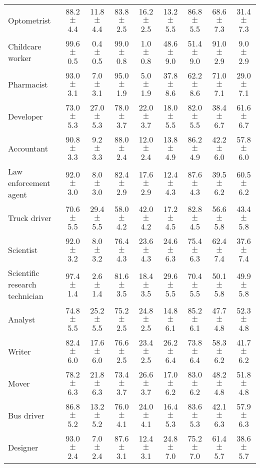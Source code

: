 \begin{table*}[p]
{\begin{tabular}{l|cc|cc|cc|cc}
Optometrist
& 88.2 $\pm$ 4.4 & 11.8 $\pm$ 4.4
& 83.8 $\pm$ 2.5 & 16.2 $\pm$ 2.5
& 13.2 $\pm$ 5.5 & 86.8 $\pm$ 5.5
& 68.6 $\pm$ 7.3 & 31.4 $\pm$ 7.3
\\
Childcare worker
& 99.6 $\pm$ 0.5 & 0.4 $\pm$ 0.5
& 99.0 $\pm$ 0.8 & 1.0 $\pm$ 0.8
& 48.6 $\pm$ 9.0 & 51.4 $\pm$ 9.0
& 91.0 $\pm$ 2.9 & 9.0 $\pm$ 2.9
\\
Pharmacist
& 93.0 $\pm$ 3.1 & 7.0 $\pm$ 3.1
& 95.0 $\pm$ 1.9 & 5.0 $\pm$ 1.9
& 37.8 $\pm$ 8.6 & 62.2 $\pm$ 8.6
& 71.0 $\pm$ 7.1 & 29.0 $\pm$ 7.1
\\
Developer
& 73.0 $\pm$ 5.3 & 27.0 $\pm$ 5.3
& 78.0 $\pm$ 3.7 & 22.0 $\pm$ 3.7
& 18.0 $\pm$ 5.5 & 82.0 $\pm$ 5.5
& 38.4 $\pm$ 6.7 & 61.6 $\pm$ 6.7
\\
Accountant
& 90.8 $\pm$ 3.3 & 9.2 $\pm$ 3.3
& 88.0 $\pm$ 2.4 & 12.0 $\pm$ 2.4
& 13.8 $\pm$ 4.9 & 86.2 $\pm$ 4.9
& 42.2 $\pm$ 6.0 & 57.8 $\pm$ 6.0
\\
Law enforcement agent
& 92.0 $\pm$ 3.0 & 8.0 $\pm$ 3.0
& 82.4 $\pm$ 2.9 & 17.6 $\pm$ 2.9
& 12.4 $\pm$ 4.3 & 87.6 $\pm$ 4.3
& 39.5 $\pm$ 6.2 & 60.5 $\pm$ 6.2
\\
Truck driver
& 70.6 $\pm$ 5.5 & 29.4 $\pm$ 5.5
& 58.0 $\pm$ 4.2 & 42.0 $\pm$ 4.2
& 17.2 $\pm$ 4.5 & 82.8 $\pm$ 4.5
& 56.6 $\pm$ 5.8 & 43.4 $\pm$ 5.8
\\
Scientist
& 92.0 $\pm$ 3.2 & 8.0 $\pm$ 3.2
& 76.4 $\pm$ 4.3 & 23.6 $\pm$ 4.3
& 24.6 $\pm$ 6.3 & 75.4 $\pm$ 6.3
& 62.4 $\pm$ 7.4 & 37.6 $\pm$ 7.4
\\
Scientific research technician
& 97.4 $\pm$ 1.4 & 2.6 $\pm$ 1.4
& 81.6 $\pm$ 3.5 & 18.4 $\pm$ 3.5
& 29.6 $\pm$ 5.5 & 70.4 $\pm$ 5.5
& 50.1 $\pm$ 5.8 & 49.9 $\pm$ 5.8
\\
Analyst
& 74.8 $\pm$ 5.5 & 25.2 $\pm$ 5.5
& 75.2 $\pm$ 2.5 & 24.8 $\pm$ 2.5
& 14.8 $\pm$ 6.1 & 85.2 $\pm$ 6.1
& 47.7 $\pm$ 4.8 & 52.3 $\pm$ 4.8
\\
Writer
& 82.4 $\pm$ 6.0 & 17.6 $\pm$ 6.0
& 76.6 $\pm$ 2.5 & 23.4 $\pm$ 2.5
& 26.2 $\pm$ 6.4 & 73.8 $\pm$ 6.4
& 58.3 $\pm$ 6.2 & 41.7 $\pm$ 6.2
\\
Mover
& 78.2 $\pm$ 6.3 & 21.8 $\pm$ 6.3
& 73.4 $\pm$ 3.7 & 26.6 $\pm$ 3.7
& 17.0 $\pm$ 6.2 & 83.0 $\pm$ 6.2
& 48.2 $\pm$ 4.8 & 51.8 $\pm$ 4.8
\\
Bus driver
& 86.8 $\pm$ 5.2 & 13.2 $\pm$ 5.2
& 76.0 $\pm$ 4.1 & 24.0 $\pm$ 4.1
& 16.4 $\pm$ 5.3 & 83.6 $\pm$ 5.3
& 42.1 $\pm$ 6.3 & 57.9 $\pm$ 6.3
\\
Designer
& 93.0 $\pm$ 2.4 & 7.0 $\pm$ 2.4
& 87.6 $\pm$ 3.1 & 12.4 $\pm$ 3.1
& 24.8 $\pm$ 7.0 & 75.2 $\pm$ 7.0
& 61.4 $\pm$ 5.7 & 38.6 $\pm$ 5.7

\end{tabular}}
\end{table*}
